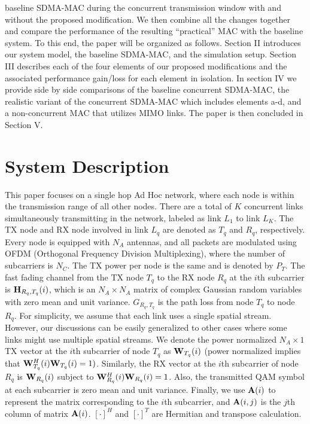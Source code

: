 \documentclass[journal, final]{IEEEtran}
\begin{document}
baseline SDMA-MAC during the concurrent transmission window with and without
the proposed modification. We then combine all the changes together and
compare the performance of the resulting ``practical'' MAC with the baseline
system. To this end, the paper will be organized as follows. Section II
introduces our system model, the baseline SDMA-MAC, and the simulation setup.
Section III describes each of the four elements of our proposed
modifications and the associated performance gain/loss for each element in
isolation. In section IV we provide side by side comparisons of the baseline
concurrent SDMA-MAC, the realistic variant of the concurrent SDMA-MAC which
includes elements a-d, and a non-concurrent MAC that utilizes MIMO links.
The paper is then concluded in Section V.

\section{System Description}

This paper focuses on a single hop Ad Hoc network, where each node is within
the transmission range of all other nodes. There are a total of $K$ concurrent links simultaneously transmitting in the network,
labeled as link $L_1$ to link $L_K$. The TX node and RX node involved in
link $L_q$ are denoted as $T_q$ and $R_q$, respectively. Every node is equipped with
$N_A$ antennas, and all packets are modulated
using OFDM (Orthogonal Frequency Division Multiplexing), where the number of subcarriers is $N_C$. The TX power per
node is the same and is denoted by $P_T$.  The fast fading
channel from the TX node $T_q$ to the RX node $R_q$ at the $i$th
subcarrier is ${\rm {\bf H}}_{R_q ,T_q } (i)$, which is an $N_A \times N_A $
matrix of complex Gaussian random variables with zero mean and unit
variance. $G_{R_q ,T_q } $ is
the path loss from node $T_q $ to node $R_q $. For simplicity, we assume that each link uses a single
spatial stream. However, our discussions can be easily generalized to other
cases where some links might use multiple spatial streams. We denote the
power normalized $N_A \times 1$ TX vector at the $i$th subcarrier of node
$T_q $ as ${\rm {\bf W}}_{T_q } (i)$ (power normalized implies that ${\rm
{\bf W}}_{T_q }^H (i){\rm {\bf W}}_{T_q } (i) = 1)$. Similarly, the RX
vector at the $i$th subcarrier of node $R_q $ is ${\rm {\bf W}}_{R_q } (i)$
subject to ${\rm {\bf W}}_{R_q }^H (i){\rm {\bf W}}_{R_q } (i) = 1$. Also, the transmitted QAM symbol at each subcarrier is zero mean and unit variance. Finally, we use ${\rm {\bf
A}}(i)$ to represent the matrix corresponding to the $i$th subcarrier, and
${\rm {\bf A}}(i,j)$ is the $j$th column of matrix ${\rm {\bf A}}(i)$. $[
\cdot ]^H$ and $[ \cdot ]^T$ are Hermitian and transpose calculation.
\end{document}
